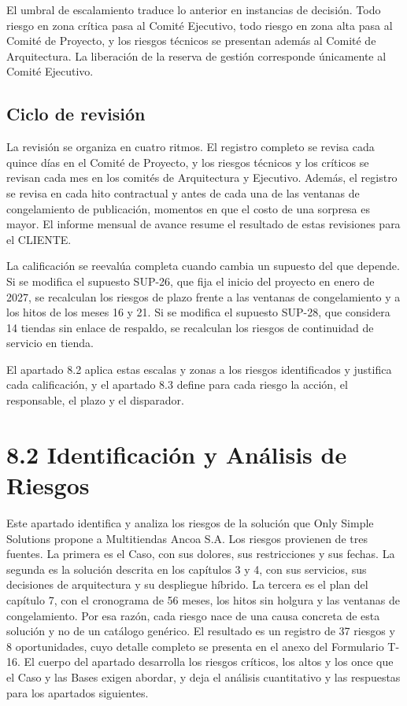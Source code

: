 \documentclass[11pt]{article}
\begin{document}
El umbral de escalamiento traduce lo anterior en instancias de decisión. Todo riesgo en zona crítica pasa al Comité Ejecutivo, todo riesgo en zona alta pasa al Comité de Proyecto, y los riesgos técnicos se presentan además al Comité de Arquitectura. La liberación de la reserva de gestión corresponde únicamente al Comité Ejecutivo.

\subsection{Ciclo de revisión}

La revisión se organiza en cuatro ritmos. El registro completo se revisa cada quince días en el Comité de Proyecto, y los riesgos técnicos y los críticos se revisan cada mes en los comités de Arquitectura y Ejecutivo. Además, el registro se revisa en cada hito contractual y antes de cada una de las ventanas de congelamiento de publicación, momentos en que el costo de una sorpresa es mayor. El informe mensual de avance resume el resultado de estas revisiones para el CLIENTE.

La calificación se reevalúa completa cuando cambia un supuesto del que depende. Si se modifica el supuesto SUP-26, que fija el inicio del proyecto en enero de 2027, se recalculan los riesgos de plazo frente a las ventanas de congelamiento y a los hitos de los meses 16 y 21. Si se modifica el supuesto SUP-28, que considera 14 tiendas sin enlace de respaldo, se recalculan los riesgos de continuidad de servicio en tienda.

El apartado 8.2 aplica estas escalas y zonas a los riesgos identificados y justifica cada calificación, y el apartado 8.3 define para cada riesgo la acción, el responsable, el plazo y el disparador.

\section{8.2 Identificación y Análisis de Riesgos}\label{identificaciuxf3n-y-anuxe1lisis-de-riesgos}

Este apartado identifica y analiza los riesgos de la solución que Only Simple Solutions propone a Multitiendas Ancoa S.A. Los riesgos provienen de tres fuentes. La primera es el Caso, con sus dolores, sus restricciones y sus fechas. La segunda es la solución descrita en los capítulos 3 y 4, con sus servicios, sus decisiones de arquitectura y su despliegue híbrido. La tercera es el plan del capítulo 7, con el cronograma de 56 meses, los hitos sin holgura y las ventanas de congelamiento. Por esa razón, cada riesgo nace de una causa concreta de esta solución y no de un catálogo genérico. El resultado es un registro de 37 riesgos y 8 oportunidades, cuyo detalle completo se presenta en el anexo del Formulario T-16. El cuerpo del apartado desarrolla los riesgos críticos, los altos y los once que el Caso y las Bases exigen abordar, y deja el análisis cuantitativo y las respuestas para los apartados siguientes.
\end{document}
